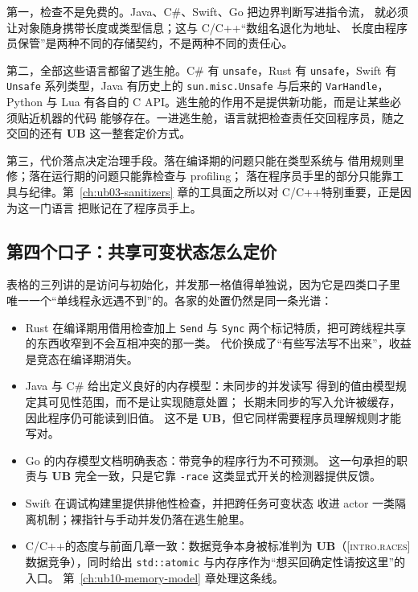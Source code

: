 \documentclass[12pt,a4paper,fontset=fandol]{ctexbook}
\newcommand{\Tp}[1]{\texttt{#1}}
\newcommand{\Lang}[1]{\textsf{#1}}
\newcommand{\CL}{\Lang{C}}
\newcommand{\CPP}{\Lang{C++}}
\newcommand{\UB}{\textbf{\textsf{UB}}}
\newcommand{\Std}[1]{\textsc{[#1]}}
\newcommand{\Clause}[1]{\textsc{\small #1}}
\begin{document}
第一，检查不是免费的。Java、C\#、Swift、Go 把边界判断写进指令流，
就必须让对象随身携带长度或类型信息；这与 \CL/\CPP “数组名退化为地址、
长度由程序员保管”是两种不同的存储契约，不是两种不同的责任心。

第二，全部这些语言都留了逃生舱。C\# 有 \Tp{unsafe}，Rust 有
\Tp{unsafe}，Swift 有 \Tp{Unsafe} 系列类型，Java 有历史上的
\Tp{sun.misc.Unsafe} 与后来的 \Tp{VarHandle}，Python 与 Lua 有各自的
C API。逃生舱的作用不是提供新功能，而是让某些必须贴近机器的代码
能够存在。一进逃生舱，语言就把检查责任交回程序员，随之交回的还有
\UB{} 这一整套定价方式。

第三，代价落点决定治理手段。落在编译期的问题只能在类型系统与
借用规则里修；落在运行期的问题只能靠检查与 profiling；
落在程序员手里的部分只能靠工具与纪律。第~\ref{ch:ub03-sanitizers} 章的工具面之所以对
\CL/\CPP 特别重要，正是因为这一门语言
把账记在了程序员手上。

\subsection{第四个口子：共享可变状态怎么定价}\label{sec:ub02-races}

表格的三列讲的是访问与初始化，并发那一格值得单独说，因为它是四类口子里
唯一一个“单线程永远遇不到”的。各家的处置仍然是同一条光谱：

\begin{itemize}
  \item \Lang{Rust} 在编译期用借用检查加上 \Tp{Send} 与 \Tp{Sync}
        两个标记特质，把可跨线程共享的东西收窄到不会互相冲突的那一类。
        代价换成了“有些写法写不出来”，收益是竞态在编译期消失。
  \item \Lang{Java} 与 \Lang{C\#} 给出定义良好的内存模型：未同步的并发读写
        得到的值由模型规定其可见性范围，而不是让实现随意处置；
        长期未同步的写入允许被缓存，因此程序仍可能读到旧值。
        这不是 \UB{}，但它同样需要程序员理解规则才能写对。
  \item \Lang{Go} 的内存模型文档明确表态：带竞争的程序行为不可预测。
        这一句承担的职责与 \UB{} 完全一致，只是它靠 \Tp{-race}
        这类显式开关的检测器提供反馈。
  \item \Lang{Swift} 在调试构建里提供排他性检查，并把跨任务可变状态
        收进 actor 一类隔离机制；裸指针与手动并发仍落在逃生舱里。
  \item \CL/\CPP 的态度与前面几章一致：数据竞争本身被标准判为
        \UB{}（\Std{intro.races} \Clause{数据竞争}），同时给出
        \Tp{std::atomic} 与内存序作为“想买回确定性请按这里”的入口。
        第~\ref{ch:ub10-memory-model} 章处理这条线。
\end{itemize}
\end{document}
